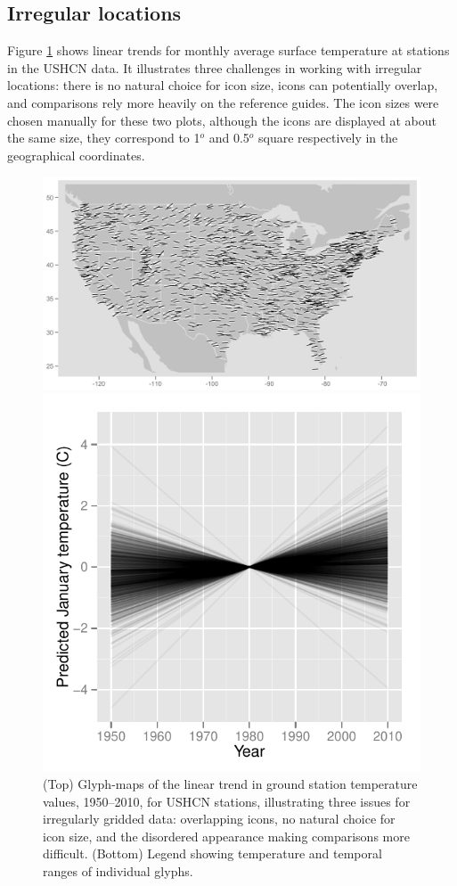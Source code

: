\documentclass[oneside]{article}
\begin{document}
\subsection{Irregular locations}
Figure \ref{fig:irregular} shows linear trends for monthly average surface temperature at stations in the USHCN data.  It illustrates three challenges in working with irregular locations: there is no natural choice for icon size, icons can potentially overlap, and comparisons rely more heavily on the reference guides.  The icon sizes were chosen manually for these two plots, although the icons are displayed at about the same size, they correspond to 1$^o$ and 0.5$^o$ square respectively in the geographical coordinates. 
\begin{figure}[htbp]
  \centering
  \includegraphics[width=1\linewidth]{usa-lin-overlap}%

\includegraphics[width=0.33\linewidth]{usa-lin-legend}
  \caption{(Top) Glyph-maps of the linear trend in ground station temperature values, 1950--2010, for USHCN stations, illustrating three issues for irregularly gridded data: overlapping icons, no natural choice for icon size, and the disordered appearance making comparisons more difficult. (Bottom) Legend showing
    temperature and temporal ranges of individual glyphs. }%
  \label{fig:irregular}
\end{figure}
\end{document}
